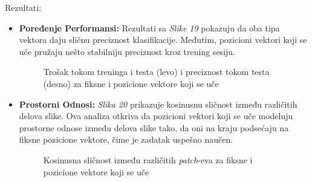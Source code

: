 \documentclass[12pt]{article}
\begin{document}
   Rezultati:
   \begin{itemize}
      \item \textbf{Poređenje Performansi:}  Rezultati sa \textit{Slike 19} pokazuju da oba tipa vektora 
      daju sličnu preciznost klasifikacije. Međutim, pozicioni vektori koji se uče 
      pružaju nešto stabilniju preciznost kroz trening sesiju.
      \begin{figure}[h!]
         \centering
         \vspace{1cm} %
         \caption{Trošak tokom treninga i testa (levo) i preciznost tokom testa (desno) za fiksne i pozicione vektore koji se uče}
         \label{fig:exp1_metr}
      \end{figure}

      \newpage
      \item \textbf{Prostorni Odnosi:} \textit{Slika 20} prikazuje 
      kosinusnu sličnost između različitih delova slike. Ova analiza otkriva da 
      pozicioni vektori koji se uče modeluju prostorne odnose između delova slike tako,
      da oni na kraju podsećaju na fiksne pozicione vektore, čime je zadatak uspešno naučen.
      \begin{figure}[h!]
         \centering
         \vspace{1cm} %
         \caption{Kosinusna sličnost između različitih \textit{patch}-eva za fiksne i pozicione vektore koji se uče}
         \label{fig:exp1_cos_sim}
      \end{figure}
   \end{itemize}
   \newpage
\end{document}
